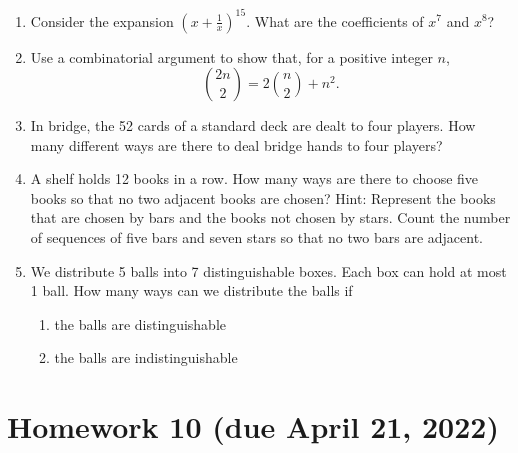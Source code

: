 \documentclass[11pt]{article}
\begin{document}
\begin{enumerate}
    \item Consider the expansion $\left(x + \frac{1}{x}\right)^{15}$. What are the coefficients of $x^7$ and $x^8$?
    \item Use a combinatorial argument to show that, for a positive integer $n$,
    \[\binom{2n}{2} = 2 \binom{n}{2} + n^2.\]
    \item In bridge, the 52 cards of a standard deck are dealt to four players. How many different ways are there to deal bridge hands to four players?
    \item  A shelf holds 12 books in a row. How many ways are there to choose five books so that no two adjacent books are chosen? Hint: Represent the books that are chosen by bars and the books not chosen by stars. Count the number of sequences of five bars and seven stars so that no two bars are adjacent.
    \item We distribute 5 balls into 7 distinguishable boxes. Each box can hold at most 1 ball. How many ways can we distribute the balls if
    \begin{enumerate}
        \item the balls are distinguishable
        \item the balls are indistinguishable
    \end{enumerate}
\end{enumerate}

\section*{Homework 10 (due April 21, 2022)}
\end{document}
